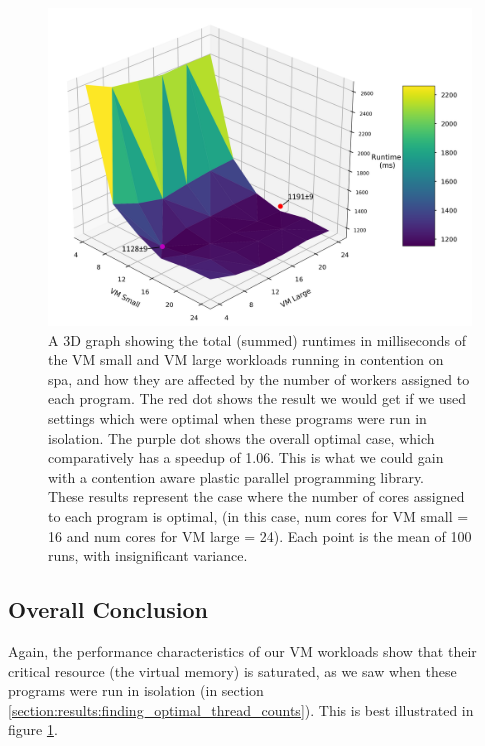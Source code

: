 \begin{figure}[H]
    \includegraphics[width=1\textwidth]{graphics/contention/spa/otwc_vm_small_and_vm_large.png}
    \caption{A 3D graph showing the total (summed) runtimes in milliseconds of the VM small and VM large workloads running in contention on spa, and how they are affected by the number of workers assigned to each program. The red dot shows the result we would get if we used settings which were optimal when these programs were run in isolation. The purple dot shows the overall optimal case, which comparatively has a speedup of 1.06. This is what we could gain with a contention aware plastic parallel programming library. \\
    These results represent the case where the number of cores assigned to each program is optimal, (in this case, num cores for VM small = 16 and num cores for VM large = 24). Each point is the mean of 100 runs, with insignificant variance.}
    \label{fig:con_spa_vm_small_and_vm_large}
\end{figure}



\subsection{Overall Conclusion}
\label{section:results:overall_conclusion2}

Again, the performance characteristics of our VM workloads show that their critical resource (the virtual memory) is saturated, as we saw when these programs were run in isolation (in section \ref{section:results:finding_optimal_thread_counts}). This is best illustrated in figure \ref{fig:con_spa_vm_small_and_vm_large}.

